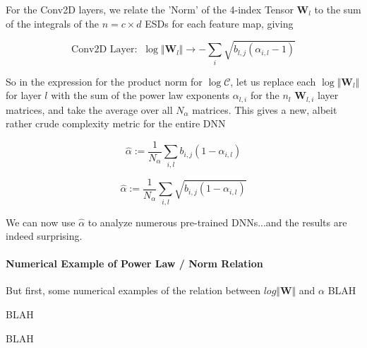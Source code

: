 For the Conv2D layers, we relate the 'Norm' of the 4-index Tensor $\mathbf{W}_{l}$ to the sum of the integrals of the $n=c\times d$ ESDs for each feature map, giving 

$$\text{Conv2D Layer:}\;\;\log\Vert\mathbf{W}_{l}\Vert\rightarrow-\sum_{i}\sqrt{b_{l,j}(\alpha_{i,l}-1)}$$

So in the expression for the product norm for $\log\mathcal{C}$, let us replace each $\log\Vert\mathbf{W}_{l}\Vert$ for layer $l$ with the sum of the power law exponents $\alpha_{l,i}$ for the $n{_l}$ $\mathbf{W}_{l,i}$ layer matrices, and take the average over all $N_{\alpha}$  matrices.  This gives a new, albeit rather crude complexity metric for the entire DNN


$$\hat{\alpha}:=\dfrac{1}{N_{\alpha}}\sum_{i,l}b_{i,j}(1-\alpha_{i,l})$$


$$\hat{\alpha}:=\dfrac{1}{N_{\alpha}}\sum_{i,l}\sqrt{b_{i,j}(1-\alpha_{i,l})}$$


We can now use $\hat{\alpha}$ to analyze numerous pre-trained DNNs...and the results are indeed surprising.

\paragraph{Numerical Example of Power Law / Norm Relation}

But first, some numerical examples of the relation between $log\Vert\mathbf{W}\Vert$ and $\alpha$
BLAH

BLAH

BLAH


